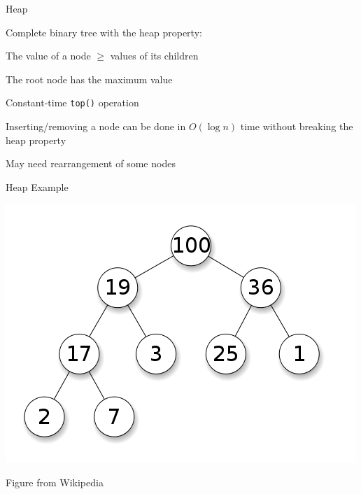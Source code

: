 \documentclass[13pt,onlymath]{beamer}
\begin{document}
\begin{frame}[fragile]{Heap}
\BIT
\item Complete binary tree with the heap property:
\BIT
\item The value of a node $\ge$ values of its children
\EIT
\item The root node has the maximum value
\BIT
\item Constant-time \verb,top(), operation
\EIT
\item Inserting/removing a node can be done in $O(\log n)$ time without breaking the heap property
\BIT
\item May need rearrangement of some nodes
\EIT
\EIT
\end{frame}

\begin{frame}{Heap Example}
\begin{center}
\includegraphics[height=0.5\textheight]{figures/heap}

Figure from Wikipedia
\end{center}
\end{frame}
\end{document}
